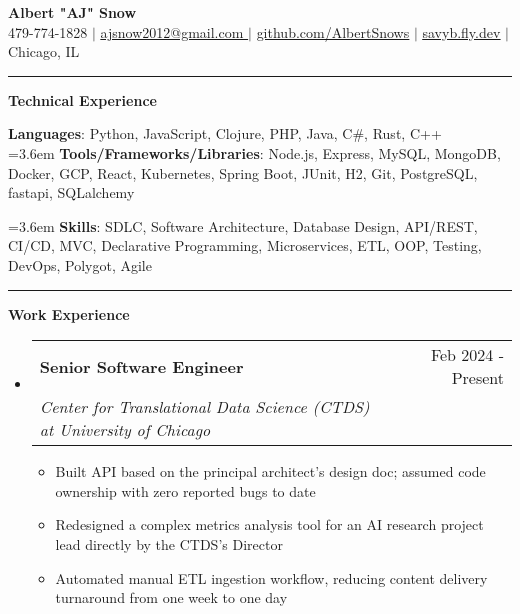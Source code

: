 \documentclass[letterpaper,11pt]{article}
\makeatletter
\newcommand{\resumeItem}[1]{
  \item\small{
    {#1 \vspace{-2pt}}
  }
}
\newcommand{\resumeSubheading}[4]{
  \vspace{-2pt}\item
    \begin{tabular*}{0.97\textwidth}[t]{l@{\extracolsep{\fill}}r}
      \textbf{#1} & #2 \\
      \textit{\small#3} & \textit{\small #4} \\
    \end{tabular*}\vspace{0pt}
}
\newcommand{\resumeSubHeadingListStart}{\begin{itemize}[leftmargin=0.15cm, label={}]}
\newcommand{\resumeSubHeadingListEnd}{\end{itemize}}
\newcommand{\resumeItemListStart}{\begin{itemize}}
\newcommand{\resumeItemListEnd}{\end{itemize}\vspace{-5pt}}
\makeatother
\begin{document}
\textbf{\normalshape \Large \textcolor{magic_blue}{Albert "AJ" Snow}} \\ \vspace{3pt}
\small 479-774-1828 $|$ 
\href{ mailto:ajsnow2012@gmail.com }
{\underline{ ajsnow2012@gmail.com }} $|$
\href{https://github.com/AlbertSnows}{\underline{github.com/AlbertSnows}}
$|$ \href{https://savyb.fly.dev/}{\underline{savyb.fly.dev}}
$|$ Chicago, IL
\noindent\rule{19.5cm}{0.4pt}

%
\textbf{\large \textcolor{magic_blue}{Technical Experience} }
\begin{onehalfspace}

  \textbf{ Languages}{: Python, JavaScript, Clojure, PHP, Java, C\#, Rust, C++ } \\

  \hangindent=3.6em
  \textbf{ Tools/Frameworks/Libraries}{:
    Node.js, Express, MySQL, MongoDB, Docker,
    GCP, React, Kubernetes, Spring Boot, JUnit, H2,
    Git,  PostgreSQL, fastapi, SQLalchemy } \\
\end{onehalfspace}

\hangindent=3.6em
\textbf{ Skills}{: }
SDLC, Software Architecture, Database Design, API/REST, CI/CD,
MVC, Declarative Programming, Microservices, ETL, OOP, Testing,
DevOps, Polygot, Agile
\noindent\rule{19.5cm}{0.4pt}

\textbf{\large \textcolor{magic_blue}{Work Experience}}

\resumeSubHeadingListStart
\resumeSubheading
{Senior Software Engineer}{Feb 2024 - Present}
{Center for Translational Data Science (CTDS) at University of Chicago}{}
\resumeItemListStart
\resumeItem{ Built API based on the principal architect's design doc; assumed code ownership with zero reported bugs to date }
\resumeItem{ Redesigned a complex metrics analysis tool for an AI research project lead directly by the CTDS's Director }
\resumeItem{ Automated manual ETL ingestion workflow, reducing content delivery turnaround from one week to one day }
\resumeItemListEnd
\resumeSubHeadingListEnd
\end{document}
